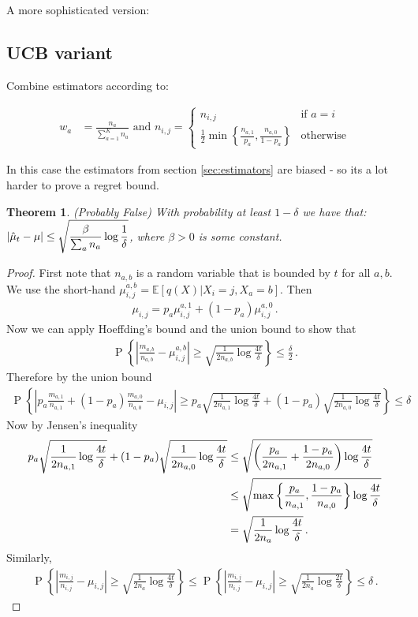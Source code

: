 \documentclass{article}
\newcommand{\E}{\mathbb E}
\newcommand{\set}[1]{\left\{#1\right\}}
\newcommand{\eq}[1]{\begin{align*}#1\end{align*}}
\renewcommand{\P}[1]{\operatorname{P}\left\{#1\right\}}
\theoremstyle{plain}
\newtheorem{theorem}{Theorem}
\theoremstyle{definition}
\begin{document}
A more sophisticated version:





\subsection{UCB variant}
Combine estimators according to:

\eq {
w_a     &= \frac{n_a}{\sum_{a=1}^K n_a} \text{ and } n_{i,j}=\begin{cases} 
n_{i,j} & \text{if } a = i \\
\frac{1}{2}\min\set{\frac{n_{a,1}}{p_a}, \frac{n_{a,0}}{1-p_a}}  & \text{otherwise}
\end{cases}
}

In this case the estimators from section \ref{sec:estimators} are biased - so its a lot harder to prove a regret bound. 

\begin{theorem} (Probably False) With probability at least $1 - \delta$ we have that:
$\displaystyle \left|\hat{\mu}_t - \mu\right| \leq \sqrt{\frac{\beta}{\sum_{a} n_a} \log{1 \over \delta}}$,
where $\beta > 0$ is some constant.
\end{theorem}

\begin{proof}
First note that $n_{a,b}$ is a random variable that is bounded by $t$ for all $a,b$.
We use the short-hand $\mu^{a,b}_{i,j} = \E[q(X) | X_i = j, X_a = b]$. Then
\eq{
\mu_{i,j} = p_a \mu_{i,j}^{a,1} + (1 - p_a) \mu_{i,j}^{a,0}\,.
}
Now we can apply Hoeffding's bound and the union bound to show that
\eq{
\P{\left|\frac{m_{a,b}}{n_{a,b}} - \mu_{i,j}^{a,b}\right| \geq \sqrt{\frac{1}{2n_{a,b}} \log \frac{4t}{\delta}}} \leq \frac{\delta}{2}\,.
}
Therefore by the union bound
\eq{
\P{\left|p_a \frac{m_{a,1}}{n_{a,1}} + (1 - p_a) \frac{m_{a,0}}{n_{a,0}} - \mu_{i,j}\right| \geq p_a \sqrt{\frac{1}{2n_{a,1}} \log\frac{4t}{\delta}}
+ (1 - p_a) \sqrt{\frac{1}{2n_{a,0}}\log\frac{4t}{\delta}}} \leq \delta\,
}
Now by Jensen's inequality 
\eq{
p_a \sqrt{\frac{1}{2n_{a,1}}\log\frac{4t}{\delta}} + (1 - p_a) \sqrt{\frac{1}{2n_{a,0}}\log\frac{4t}{\delta}}
&\leq \sqrt{\left(\frac{p_a}{2n_{a,1}} + \frac{1-p_a}{2n_{a,0}}\right)\log \frac{4t}{\delta}} \\
&\leq \sqrt{\max\set{\frac{p_a}{n_{a,1}}, \frac{1-p_a}{n_{a,0}}} \log\frac{4t}{\delta}} \\
&= \sqrt{{1 \over 2n_a} \log\frac{4t}{\delta}}\,.
}
Similarly,
\eq{
\P{\left|\frac{m_{i,j}}{n_{i,j}} - \mu_{i,j}\right| \geq \sqrt{\frac{1}{2n_a} \log\frac{4t}{\delta}}} \leq
\P{\left|\frac{m_{i,j}}{n_{i,j}} - \mu_{i,j}\right| \geq \sqrt{\frac{1}{2n_a} \log\frac{2t}{\delta}}} \leq \delta\,.
}
\end{proof}
\end{document}
